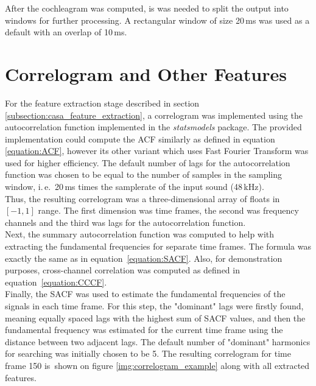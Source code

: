 After the cochleagram was computed, is was needed to split the output into windows for further processing. A rectangular window of size 20\,ms was used as a default with an overlap of 10\,ms.

\section{Correlogram and Other Features}

For the feature extraction stage described in section \ref{subsection:casa_feature_extraction}, a correlogram was implemented using the autocorrelation function implemented in the \textit{statsmodels} package. The provided implementation could compute the ACF similarly as defined in equation \ref{equation:ACF}, however its other variant which uses Fast Fourier Transform was used for higher efficiency. The default number of lags for the autocorrelation function was chosen to be equal to the number of samples in the sampling window, i.\,e.~20\,ms times the samplerate of the input sound (48\,kHz).\\

Thus, the resulting correlogram was a three-dimensional array of floats in $[-1, 1]$ range. The first dimension was time frames, the second was frequency channels and the third was lags for the autocorrelation function.\\

Next, the summary autocorrelation function was computed to help with extracting the fundamental frequencies for separate time frames. The formula was exactly the same as in equation~\ref{equation:SACF}. Also, for demonstration purposes, cross-channel correlation was computed as defined in equation~\ref{equation:CCCF}.\\

Finally, the SACF was used to estimate the fundamental frequencies of the signals in each time frame. For this step, the "dominant" lags were firstly found, meaning equally spaced lags with the highest sum of SACF values, and then the fundamental frequency was estimated for the current time frame using the distance between two adjacent lags. The default number of "dominant" harmonics for searching was initially chosen to be 5. The resulting correlogram for time frame 150 is~shown on figure \ref{img:correlogram_example} along with all extracted features.

